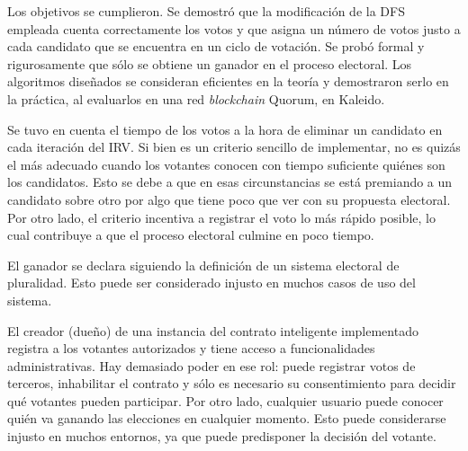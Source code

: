 \begin{conclusions}
    Los objetivos se cumplieron. Se demostr\'o que la modificaci\'on de la DFS empleada cuenta correctamente los votos y que asigna un n\'umero de votos justo a cada candidato que se encuentra en un ciclo de votaci\'on. Se prob\'o formal y rigurosamente que s\'olo se obtiene un ganador en el proceso electoral. Los algoritmos dise\~nados se consideran eficientes en la teor\'ia y demostraron serlo  en la pr\'actica, al evaluarlos en una red \textit{blockchain} Quorum, en Kaleido. 

    Se tuvo en cuenta el tiempo de los votos a la hora de eliminar un candidato  en cada iteraci\'on del IRV. Si bien es un criterio sencillo de implementar, no es quiz\'as el m\'as adecuado cuando los votantes conocen con tiempo suficiente qui\'enes son los candidatos. Esto se debe a que en esas circunstancias se est\'a premiando a un candidato sobre otro por algo que tiene poco que ver con su propuesta electoral. Por otro lado, el criterio incentiva a registrar el voto lo m\'as r\'apido posible, lo cual contribuye a que  el proceso electoral culmine en poco tiempo.

    El ganador se declara siguiendo  la definici\'on de un sistema electoral de pluralidad. Esto puede ser considerado injusto en muchos  casos de uso del sistema.

    El creador (due\~no) de una instancia del contrato inteligente implementado  registra a los votantes autorizados y tiene acceso a funcionalidades administrativas. Hay demasiado poder en ese rol: puede registrar votos de terceros, inhabilitar el contrato y s\'olo es necesario su consentimiento para  decidir qu\'e votantes pueden participar. Por otro lado, cualquier usuario puede conocer qui\'en va ganando las elecciones en cualquier momento. Esto puede considerarse injusto en muchos entornos, ya que puede predisponer la decisi\'on del votante.

\end{conclusions}
